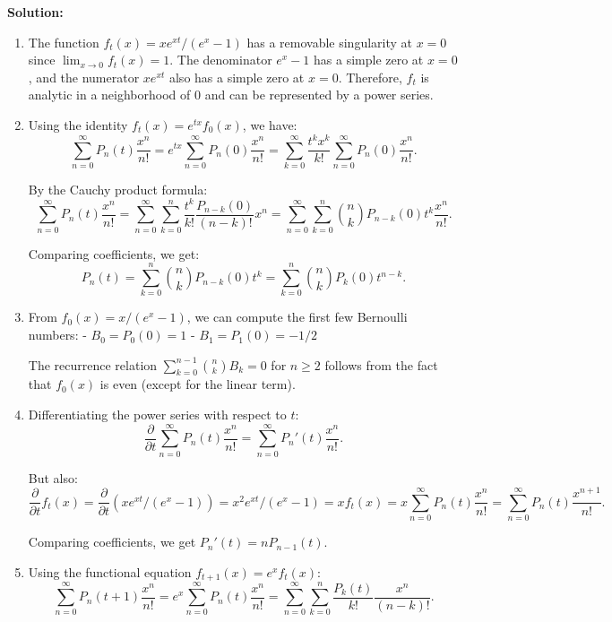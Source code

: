 \noindent\textbf{Solution:}
\begin{enumerate}[label=(\alph*)]
\item The function \( f_t(x) = xe^{xt}/(e^x - 1) \) has a removable singularity at \( x = 0 \) since \( \lim_{x \to 0} f_t(x) = 1 \). The denominator \( e^x - 1 \) has a simple zero at \( x = 0 \), and the numerator \( xe^{xt} \) also has a simple zero at \( x = 0 \). Therefore, \( f_t \) is analytic in a neighborhood of 0 and can be represented by a power series.

\item Using the identity \( f_t(x) = e^{tx} f_0(x) \), we have:
\[\sum_{n=0}^\infty P_n(t) \frac{x^n}{n!} = e^{tx} \sum_{n=0}^\infty P_n(0) \frac{x^n}{n!} = \sum_{k=0}^\infty \frac{t^k x^k}{k!} \sum_{n=0}^\infty P_n(0) \frac{x^n}{n!}.\]

By the Cauchy product formula:
\[\sum_{n=0}^\infty P_n(t) \frac{x^n}{n!} = \sum_{n=0}^\infty \sum_{k=0}^n \frac{t^k}{k!} \frac{P_{n-k}(0)}{(n-k)!} x^n = \sum_{n=0}^\infty \sum_{k=0}^n \binom{n}{k} P_{n-k}(0) t^k \frac{x^n}{n!}.\]

Comparing coefficients, we get:
\[P_n(t) = \sum_{k=0}^n \binom{n}{k} P_{n-k}(0) t^k = \sum_{k=0}^n \binom{n}{k} P_k(0) t^{n-k}.\]

\item From \( f_0(x) = x/(e^x - 1) \), we can compute the first few Bernoulli numbers:
- \( B_0 = P_0(0) = 1 \)
- \( B_1 = P_1(0) = -1/2 \)

The recurrence relation \( \sum_{k=0}^{n-1} \binom{n}{k} B_k = 0 \) for \( n \geq 2 \) follows from the fact that \( f_0(x) \) is even (except for the linear term).

\item Differentiating the power series with respect to \( t \):
\[\frac{\partial}{\partial t} \sum_{n=0}^\infty P_n(t) \frac{x^n}{n!} = \sum_{n=0}^\infty P_n'(t) \frac{x^n}{n!}.\]

But also:
\[\frac{\partial}{\partial t} f_t(x) = \frac{\partial}{\partial t} (xe^{xt}/(e^x - 1)) = x^2 e^{xt}/(e^x - 1) = x f_t(x) = x \sum_{n=0}^\infty P_n(t) \frac{x^n}{n!} = \sum_{n=0}^\infty P_n(t) \frac{x^{n+1}}{n!}.\]

Comparing coefficients, we get \( P_n'(t) = nP_{n-1}(t) \).

\item Using the functional equation \( f_{t+1}(x) = e^x f_t(x) \):
\[\sum_{n=0}^\infty P_n(t+1) \frac{x^n}{n!} = e^x \sum_{n=0}^\infty P_n(t) \frac{x^n}{n!} = \sum_{n=0}^\infty \sum_{k=0}^n \frac{P_k(t)}{k!} \frac{x^n}{(n-k)!}.\]


\end{enumerate}
